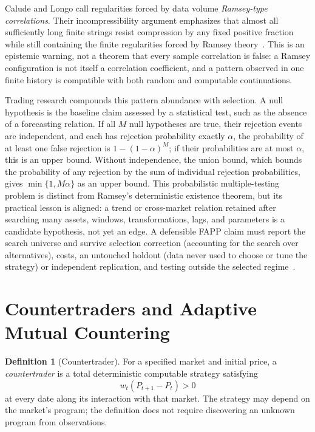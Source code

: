 \documentclass[aps,pra,reprint,superscriptaddress,amsmath,amssymb,floatfix]{revtex4-2}
\theoremstyle{plain}
\theoremstyle{definition}
\newtheorem{definition}{Definition}
\theoremstyle{remark}
\begin{document}
Calude and Longo call regularities forced by data volume \emph{Ramsey-type
correlations}. Their incompressibility argument emphasizes that almost all
sufficiently long finite strings resist compression by any fixed positive
fraction while still containing the finite regularities forced by Ramsey
theory~\cite{Calude2016}. This is an epistemic warning, not a theorem that every
sample correlation is false: a Ramsey configuration is not itself a
correlation coefficient, and a pattern observed in one finite history is
compatible with both random and computable continuations.

Trading research compounds this pattern abundance with selection. A null
hypothesis is the baseline claim assessed by a statistical test, such as the
absence of a forecasting relation. If all \(M\) null hypotheses are true,
their rejection events are independent, and
each has rejection probability exactly \(\alpha\), the probability of at least
one false rejection is
\(1-(1-\alpha)^M\); if their probabilities are at most \(\alpha\), this is an
upper bound. Without independence, the union bound, which bounds the
probability of any rejection by the sum of individual rejection probabilities,
gives
\(\min\{1,M\alpha\}\) as an upper bound. This
probabilistic multiple-testing problem is distinct from Ramsey's deterministic
existence theorem, but its practical lesson is aligned: a trend or cross-market
relation retained after searching many assets, windows, transformations, lags,
and parameters is a candidate hypothesis, not yet an edge. A defensible FAPP
claim must report the search universe and survive selection correction
(accounting for the search over alternatives), costs, an untouched holdout
(data never used to choose or tune the strategy) or independent replication,
and testing outside
the selected regime~\cite{BaileyLopez2014}.

\section{Countertraders and Adaptive Mutual Countering}
\label{sec:countertrader}

\begin{definition}[Countertrader]
For a specified market and initial price, a \emph{countertrader} is a total
deterministic computable strategy satisfying
\[
  w_t(P_{t+1}-P_t)>0
\]
at every date along its interaction with that market. The strategy may
depend on the market's program; the definition does not require discovering
an unknown program from observations.
\end{definition}
\end{document}
